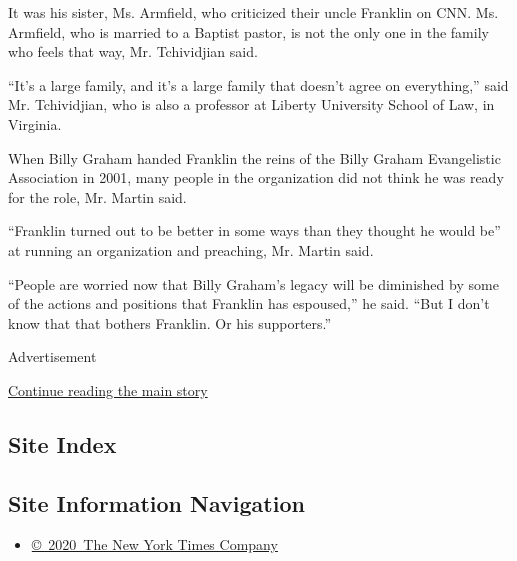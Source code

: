 It was his sister, Ms. Armfield, who criticized their uncle Franklin on
CNN. Ms. Armfield, who is married to a Baptist pastor, is not the only
one in the family who feels that way, Mr. Tchividjian said.

``It's a large family, and it's a large family that doesn't agree on
everything,'' said Mr. Tchividjian, who is also a professor at Liberty
University School of Law, in Virginia.

When Billy Graham handed Franklin the reins of the Billy Graham
Evangelistic Association in 2001, many people in the organization did
not think he was ready for the role, Mr. Martin said.

``Franklin turned out to be better in some ways than they thought he
would be'' at running an organization and preaching, Mr. Martin said.

``People are worried now that Billy Graham's legacy will be diminished
by some of the actions and positions that Franklin has espoused,'' he
said. ``But I don't know that that bothers Franklin. Or his
supporters.''

Advertisement

\protect\hyperlink{after-bottom}{Continue reading the main story}

\hypertarget{site-index}{%
\subsection{Site Index}\label{site-index}}

\hypertarget{site-information-navigation}{%
\subsection{Site Information
Navigation}\label{site-information-navigation}}

\begin{itemize}
\tightlist
\item
  \href{https://help.nytimes3xbfgragh.onion/hc/en-us/articles/115014792127-Copyright-notice}{©~2020~The
  New York Times Company}
\end{itemize}

